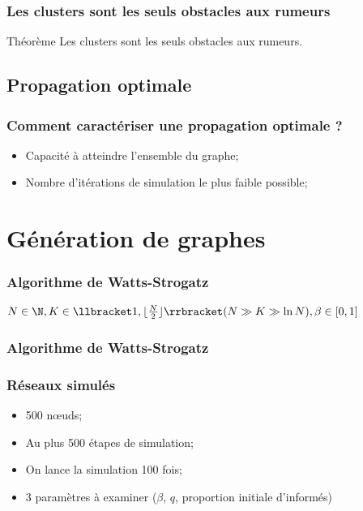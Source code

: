 \documentclass{beamer}
\newcommand{\illustration}[1]{
  \fontsize{8}{10}\selectfont
  \begin{center}
  
  \end{center}
}
\begin{document}
\begin{frame}
  \frametitle{Les clusters sont les seuls obstacles aux rumeurs}
  \begin{block}{Théorème}
    Les clusters sont les seuls obstacles aux rumeurs.
  \end{block}
\end{frame}

\subsection{Propagation optimale}
\begin{frame}
  \frametitle{Comment caractériser une propagation optimale ?}
  \begin{itemize}
    \item<1-> Capacité à atteindre l'ensemble du graphe;
    \item<2-> Nombre d'itérations de simulation le plus faible possible;
  \end{itemize}
  

\end{frame}

\section{Génération de graphes}
\begin{frame}
  \frametitle{Algorithme de Watts-Strogatz}
  \begin{center}
  $N \in \N, K \in \llbracket 1, \lfloor\frac{N}{2}\rfloor\rrbracket (N \gg K \gg \ln N), \beta \in [0,1]$
  \end{center}
\end{frame}
\begin{frame}
  \frametitle{Algorithme de Watts-Strogatz}
  \only<1-1>{\illustration{WS_1}}
  \only<2-2>{\illustration{WS_2}}
  \only<3-3>{\illustration{WS_3}}
  \only<4-4>{\illustration{WS_4}}
  \only<5-5>{\illustration{WS_5}}
\end{frame}


\begin{frame}
  \frametitle{Réseaux simulés}
  \begin{itemize}
    \item<1-> 500 nœuds;
    \item<2-> Au plus 500 étapes de simulation;
    \item<3-> On lance la simulation 100 fois;
    \item<4-> 3 paramètres à examiner ($\beta$, $q$, proportion initiale d'informés)
  \end{itemize}
\end{frame}
\end{document}
